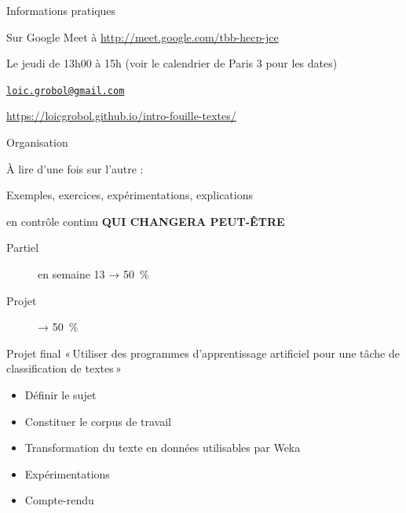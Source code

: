 \documentclass[xcolor={svgnames}, french]{beamer}
\title{\titlepagetitle}
\subtitle{\titlepagesubtitle}
\author{\textbf{\myname} (\mylab)}
\institute{}
\date{\tiny Version {\yyyymmdddate\today}T\currenttime}
\begin{document}

\begin{frame}[plain]
	\titlepage %
\end{frame}

\lecture{\titlepagesubtitle}{\docdate}
\begin{frame}{Informations pratiques}
	\begin{description}[*]
		\item[Où] Sur Google Meet à \url{http://meet.google.com/tbb-hecp-jce}
		\item[Quand] Le jeudi de 13h00 à 15h (voir le calendrier de Paris 3 pour les dates)
		\item[Email] \href{mailto:loic.grobol@gmail.com}{\texttt{loic.grobol@gmail.com}}
		\item[Web] \url{https://loicgrobol.github.io/intro-fouille-textes/}
	\end{description}
\end{frame}

\begin{frame}{Organisation}
	\begin{description}[*]
		\item[Poly] À lire d'une fois sur l'autre :\\
			{\footnotesize{}}
		\item[Cours] Exemples, exercices, expérimentations, explications
		\item[Évaluation] en contrôle continu \textbf{QUI CHANGERA PEUT-ÊTRE}
			\begin{description}
				\item[Partiel] en semaine 13 → \SI{50}{\percent}
				\item[Projet] → \SI{50}{\percent}
			\end{description}
	\end{description}
\end{frame}

\begin{frame}{Projet final}
	« Utiliser des programmes d'apprentissage artificiel pour une tâche de classification de textes »
	\begin{itemize}
		\item Définir le sujet
		\item Constituer le corpus de travail
		\item Transformation du texte en données utilisables par Weka
		\item Expérimentations
		\item Compte-rendu
	\end{itemize}
\end{frame}
\end{document}
